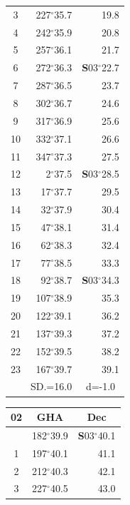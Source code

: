 \documentclass[10pt, a4paper]{report}
\begin{document}
\begin{scriptsize}
\begin{tabular*}{0.2\textwidth}[t]{@{\extracolsep{\fill}}|c|rr|}
3 & 227$^\circ$35.7 & \raisebox{0.24ex}{\boldmath$\cdot$~\boldmath$\cdot$~~}19.8\\
4 & 242$^\circ$35.9 & 20.8\\
5 & 257$^\circ$36.1 & 21.7\\[2Pt]
6 & 272$^\circ$36.3 & \textbf{S}03$^\circ$22.7\\
7 & 287$^\circ$36.5 & 23.7\\
8 & 302$^\circ$36.7 & 24.6\\
9 & 317$^\circ$36.9 & \raisebox{0.24ex}{\boldmath$\cdot$~\boldmath$\cdot$~~}25.6\\
10 & 332$^\circ$37.1 & 26.6\\
11 & 347$^\circ$37.3 & 27.5\\[2Pt]
12 & 2$^\circ$37.5 & \textbf{S}03$^\circ$28.5\\
13 & 17$^\circ$37.7 & 29.5\\
14 & 32$^\circ$37.9 & 30.4\\
15 & 47$^\circ$38.1 & \raisebox{0.24ex}{\boldmath$\cdot$~\boldmath$\cdot$~~}31.4\\
16 & 62$^\circ$38.3 & 32.4\\
17 & 77$^\circ$38.5 & 33.3\\[2Pt]
18 & 92$^\circ$38.7 & \textbf{S}03$^\circ$34.3\\
19 & 107$^\circ$38.9 & 35.3\\
20 & 122$^\circ$39.1 & 36.2\\
21 & 137$^\circ$39.3 & \raisebox{0.24ex}{\boldmath$\cdot$~\boldmath$\cdot$~~}37.2\\
22 & 152$^\circ$39.5 & 38.2\\
23 & 167$^\circ$39.7 & 39.1\\
\hline
\rule{0pt}{2.4ex} & \multicolumn{1}{c}{SD.=16.0} & \multicolumn{1}{c|}{d=-1.0}\\
\hline
\end{tabular*}\noindent
\begin{tabular*}{0.2\textwidth}[t]{@{\extracolsep{\fill}}|c|rr|}
\hline
\multicolumn{1}{|c|}{\rule{0pt}{2.6ex}\textbf{02}} & \multicolumn{1}{c}{\textbf{GHA}} & \multicolumn{1}{c|}{\textbf{Dec}}\\
\hline\rule{0pt}{2.6ex}\noindent
0 & 182$^\circ$39.9 & \textbf{S}03$^\circ$40.1\\
1 & 197$^\circ$40.1 & 41.1\\
2 & 212$^\circ$40.3 & 42.1\\
3 & 227$^\circ$40.5 & \raisebox{0.24ex}{\boldmath$\cdot$~\boldmath$\cdot$~~}43.0\\

\end{tabular*}
\end{scriptsize}
\end{document}
